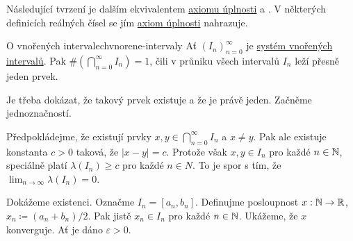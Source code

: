Následující tvrzení je dalším ekvivalentem \hyperref[prop:axiom-uplnosti]{axiomu
úplnosti} a . V některých definicích reálných
čísel se jím \hyperref[prop:axiom-uplnosti]{axiom úplnosti} nahrazuje.

\begin{proposition}{O vnořených intervalech}{vnorene-intervaly}
 Ať $(I_n)_{n=0}^{\infty}$ je \hyperref[def:system-vnorenych-intervalu]{systém
 vnořených intervalů}. Pak $\# (\bigcap_{n=0}^{\infty} I_n) = 1$, čili v průniku
 všech intervalů $I_n$ leží přesně jeden prvek.
\end{proposition}
\begin{propproof}
 Je třeba dokázat, že takový prvek existuje a že je právě jeden. Začněme
 jednoznačností.

 Předpokládejme, že existují prvky $x,y \in \bigcap_{n=0}^{\infty} I_n$ a $x
 \neq y$. Pak ale existuje konstanta $c>0$ taková, že $|x-y| = c$. Protože však
 $x,y \in I_n$ pro každé $n \in \mathbb{N}$, speciálně platí $\lambda(I_n) \geq c$ pro
 každé $n \in N$. To je spor s tím, že $\lim_{n \to \infty} \lambda(I_n) = 0$.

 Dokážeme existenci. Označme $I_n = [a_n,b_n]$. Definujme posloupnost $x:\mathbb{N} \to
 \mathbb{R}$, $x_n \coloneqq (a_n + b_n) / 2$. Pak jistě $x_n \in I_n$ pro každé $n \in
 \mathbb{N}$. Ukážeme, že $x$ konverguje. Ať je dáno $\varepsilon>0$.
\end{propproof}
